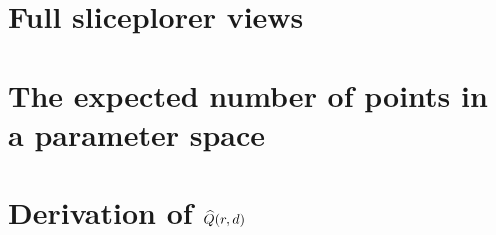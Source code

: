 \documentclass[a4paper,12pt]{memoir}
\begin{document}
\begin{appendices}

\chapter{Full sliceplorer views}
\label{app:sliceplorer_ml}


\chapter{The expected number of points in a parameter space}
\label{app:exppts}


\chapter{Derivation of $\widehat{Q}(r,d)$}
\label{app:expfrags}


\end{appendices}



\end{document}

